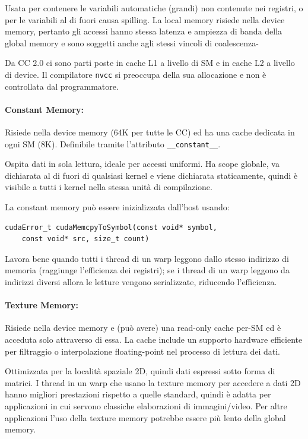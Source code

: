 Usata per contenere le variabili automatiche (grandi) non contenute nei registri, o per le variabili al di fuori causa spilling. La local memory risiede nella device memory, pertanto gli accessi hanno stessa latenza e ampiezza di banda della global memory e sono soggetti anche agli stessi vincoli di coalescenza-

Da CC 2.0 ci sono parti poste in cache L1 a livello di SM e in cache L2 a livello di device. Il compilatore \texttt{nvcc} si preoccupa della sua allocazione e non è controllata dal programmatore.

\paragraph{Constant Memory:} Risiede nella device memory (64K per tutte le CC) ed ha una cache dedicata in ogni SM (8K). Definibile tramite l'attributo \texttt{\_\_constant\_\_}. 

Ospita dati in sola lettura, ideale per accessi uniformi. Ha scope globale, va dichiarata al di fuori di qualsiasi kernel e viene dichiarata staticamente, quindi è visibile a tutti i kernel nella stessa unità di compilazione.

La constant memory può essere inizializzata dall'host usando:
\begin{verbatim}
cudaError_t cudaMemcpyToSymbol(const void* symbol,
    const void* src, size_t count)
\end{verbatim}

Lavora bene quando tutti i thread di un warp leggono dallo stesso indirizzo di memoria (raggiunge l'efficienza dei registri); se i thread di un warp leggono da indirizzi diversi allora le letture vengono serializzate, riducendo l'efficienza.

\paragraph{Texture Memory:} Risiede nella device memory e (può avere) una read-only cache per-SM ed è acceduta solo attraverso di essa. La cache include un supporto hardware efficiente per filtraggio o interpolazione floating-point nel processo di lettura dei dati. 

Ottimizzata per la località spaziale 2D, quindi dati espressi sotto forma di matrici. I thread in un warp che usano la texture memory per accedere a dati 2D hanno migliori prestazioni rispetto a quelle standard, quindi è adatta per applicazioni in cui servono classiche elaborazioni di immagini/video. Per altre applicazioni l’uso della texture memory potrebbe essere più lento della global memory.

